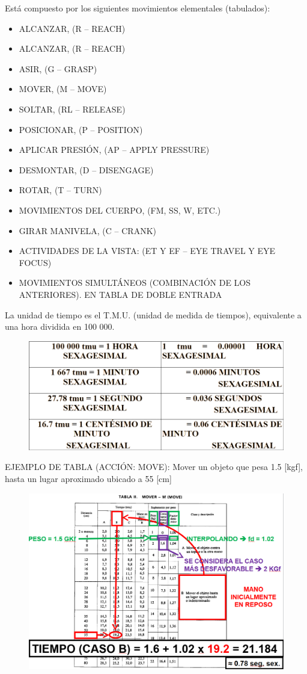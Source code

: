\documentclass[a4paper,oneside,11pt]{article}
\begin{document}
Está compuesto por los siguientes movimientos elementales (tabulados):
\begin{itemize}
    \item ALCANZAR, (R – REACH)
    \item  ALCANZAR, (R – REACH)
    \item   ASIR, (G – GRASP)
    \item   MOVER, (M – MOVE)
    \item   SOLTAR, (RL – RELEASE)
    \item   POSICIONAR, (P – POSITION)
    \item   APLICAR PRESIÓN, (AP – APPLY PRESSURE)
    \item   DESMONTAR, (D – DISENGAGE)
    \item   ROTAR, (T – TURN)
    \item    MOVIMIENTOS DEL CUERPO, (FM, SS, W, ETC.)
    \item   GIRAR MANIVELA, (C – CRANK) 
    \item   ACTIVIDADES DE LA VISTA: (ET Y EF – EYE TRAVEL Y EYE FOCUS)
    \item   MOVIMIENTOS SIMULTÁNEOS (COMBINACIÓN DE LOS ANTERIORES). EN TABLA DE DOBLE ENTRADA
\end{itemize}

La unidad de tiempo es el T.M.U. (unidad de medida de tiempos), equivalente a una hora dividida en 100 000.

\begin{figure} [ht!]
    \centering
    \includegraphics[width=0.5\linewidth]{tmu.png}
\end{figure}


EJEMPLO DE TABLA (ACCIÓN: MOVE): Mover un objeto que pesa 1.5 [kgf], hasta un lugar aproximado ubicado a 55 [cm]


\begin{figure} [ht!]
    \centering
    \includegraphics[scale=.38]{ejemplo mover 1.png}
\end{figure}
\end{document}
